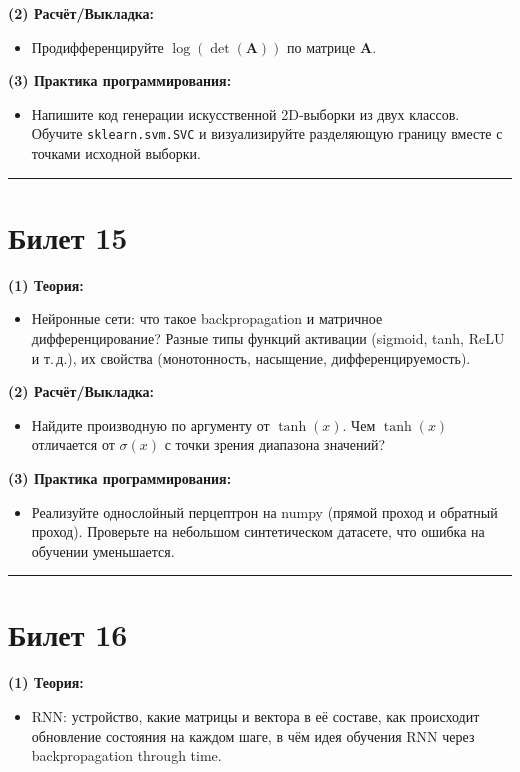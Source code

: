 \documentclass[a4paper,12pt]{article}
\begin{document}
\textbf{(2) Расчёт/Выкладка:}
\begin{itemize}
  \item Продифференцируйте $\log(\det(\mathbf{A}))$ по матрице $\mathbf{A}$.
\end{itemize}

\textbf{(3) Практика программирования:}
\begin{itemize}
  \item Напишите код генерации искусственной 2D-выборки из двух классов. Обучите \texttt{sklearn.svm.SVC} и визуализируйте разделяющую границу вместе с точками исходной выборки.
\end{itemize}

\noindent\rule{\textwidth}{0.4pt}
\newpage

\section*{Билет 15}
\textbf{(1) Теория:}
\begin{itemize}
  \item Нейронные сети: что такое backpropagation и матричное дифференцирование? Разные типы функций активации (sigmoid, tanh, ReLU и т.\,д.), их свойства (монотонность, насыщение, дифференцируемость).
\end{itemize}

\textbf{(2) Расчёт/Выкладка:}
\begin{itemize}
  \item Найдите производную по аргументу от $\tanh(x)$. Чем $\tanh(x)$ отличается от $\sigma(x)$ с точки зрения диапазона значений?
\end{itemize}

\textbf{(3) Практика программирования:}
\begin{itemize}
  \item Реализуйте однослойный перцептрон на numpy (прямой проход и обратный проход). Проверьте на небольшом синтетическом датасете, что ошибка на обучении уменьшается.
\end{itemize}

\noindent\rule{\textwidth}{0.4pt}

\section*{Билет 16}
\textbf{(1) Теория:}
\begin{itemize}
  \item RNN: устройство, какие матрицы и вектора в её составе, как происходит обновление состояния на каждом шаге, в чём идея обучения RNN через backpropagation through time.
\end{itemize}
\end{document}
